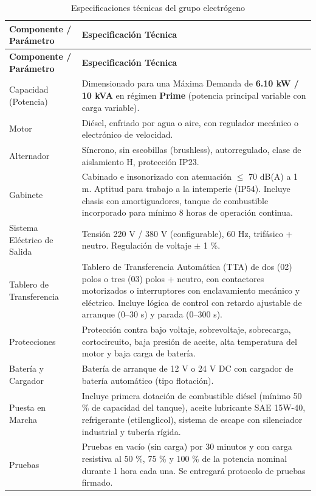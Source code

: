 \documentclass[12pt,a4paper]{article}
\begin{document}
\begin{longtable}{L{4.5cm}p{10.5cm}}
  \caption{Especificaciones técnicas del grupo electrógeno}
  \label{tab:ge}\\
  \toprule
  \textbf{Componente / Parámetro} & \textbf{Especificación Técnica} \\
  \midrule
  \endfirsthead
  \toprule
  \textbf{Componente / Parámetro} & \textbf{Especificación Técnica} \\
  \midrule
  \endhead
  Capacidad (Potencia) & Dimensionado para una Máxima Demanda de \textbf{6.10 kW / 10 kVA} en régimen \textbf{Prime} (potencia principal variable con carga variable). \\
  Motor & Diésel, enfriado por agua o aire, con regulador mecánico o electrónico de velocidad. \\
  Alternador & Síncrono, sin escobillas (brushless), autorregulado, clase de aislamiento H, protección IP23. \\
  Gabinete & Cabinado e insonorizado con atenuación $\leq$ 70 dB(A) a 1 m. Aptitud para trabajo a la intemperie (IP54). Incluye chasis con amortiguadores, tanque de combustible incorporado para mínimo 8 horas de operación continua. \\
  Sistema Eléctrico de Salida & Tensión 220 V / 380 V (configurable), 60 Hz, trifásico + neutro. Regulación de voltaje $\pm$ 1 \%. \\
  Tablero de Transferencia & Tablero de Transferencia Automática (TTA) de dos (02) polos o tres (03) polos + neutro, con contactores motorizados o interruptores con enclavamiento mecánico y eléctrico. Incluye lógica de control con retardo ajustable de arranque (0--30 s) y parada (0--300 s). \\
  Protecciones & Protección contra bajo voltaje, sobrevoltaje, sobrecarga, cortocircuito, baja presión de aceite, alta temperatura del motor y baja carga de batería. \\
  Batería y Cargador & Batería de arranque de 12 V o 24 V DC con cargador de batería automático (tipo flotación). \\
  Puesta en Marcha & Incluye primera dotación de combustible diésel (mínimo 50 \% de capacidad del tanque), aceite lubricante SAE 15W-40, refrigerante (etilenglicol), sistema de escape con silenciador industrial y tubería rígida. \\
  Pruebas & Pruebas en vacío (sin carga) por 30 minutos y con carga resistiva al 50 \%, 75 \% y 100 \% de la potencia nominal durante 1 hora cada una. Se entregará protocolo de pruebas firmado. \\
  \bottomrule
\end{longtable}
\end{document}
